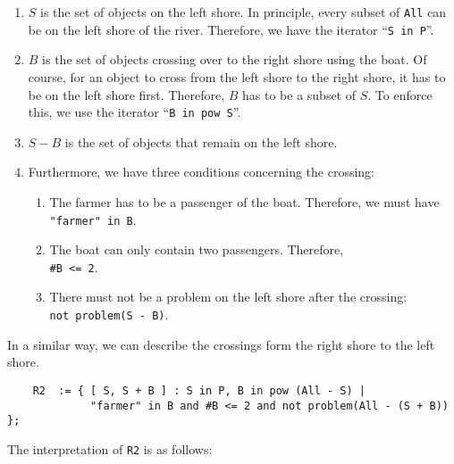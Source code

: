 \begin{enumerate}
\item $S$ is the set of objects on the left shore.  In principle,
      every subset of \texttt{All} can be on the left shore of the river.  Therefore, 
      we have the iterator ``\texttt{S in P}''.
\item $B$ is the set of objects crossing over to the right shore using the boat.
      Of course, for an object to cross from the left shore to the right shore, it has to be
      on the left shore first.  Therefore, $B$ has to be a subset of $S$.  To enforce this,
      we use the iterator ``\texttt{B in pow S}''.
\item $S - B$ is the set of objects that remain on the left shore.
\item Furthermore, we have three conditions concerning the crossing:
      \begin{enumerate}
      \item The farmer has to be a passenger of the boat.  Therefore, we must have
            \\[0.2cm]
            \hspace*{1.3cm}
            \texttt{"farmer" in B}.
      \item The boat can only contain two passengers.  Therefore, 
            \\[0.2cm]
            \hspace*{1.3cm} \texttt{\#B <= 2}.
      \item There must not be a problem on the left shore after the crossing:
            \\[0.2cm]
            \hspace*{1.3cm}
            \texttt{not problem(S - B)}.
      \end{enumerate}
\end{enumerate}
In a similar way, we can describe the crossings form the right shore to the left shore.
\begin{verbatim}
    R2  := { [ S, S + B ] : S in P, B in pow (All - S) |
             "farmer" in B and #B <= 2 and not problem(All - (S + B)) };
\end{verbatim}
The interpretation of \texttt{R2} is as follows:
